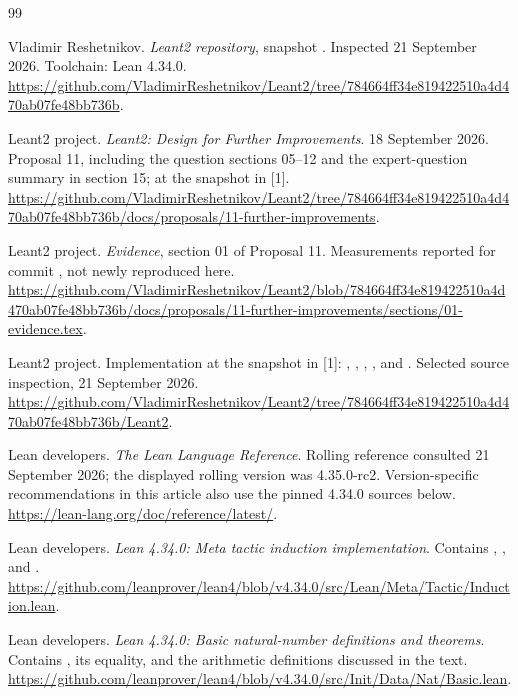 \begin{thebibliography}{99}
\small\raggedright
\setlength{\itemsep}{2pt}
\setlength{\parsep}{0pt}
\setlength{\parskip}{0pt}

 Vladimir Reshetnikov.
\emph{Leant2 repository}, snapshot
.
Inspected 21 September 2026. Toolchain: Lean 4.34.0.
\url{https://github.com/VladimirReshetnikov/Leant2/tree/784664ff34e819422510a4d470ab07fe48bb736b}.

 Leant2 project.
\emph{Leant2: Design for Further Improvements}.
18 September 2026. Proposal 11, including the question sections 05--12 and the expert-question summary in section 15; at the snapshot in [1].
\url{https://github.com/VladimirReshetnikov/Leant2/tree/784664ff34e819422510a4d470ab07fe48bb736b/docs/proposals/11-further-improvements}.

 Leant2 project.
\emph{Evidence}, section 01 of Proposal 11.
Measurements reported for commit , not newly reproduced here.
\url{https://github.com/VladimirReshetnikov/Leant2/blob/784664ff34e819422510a4d470ab07fe48bb736b/docs/proposals/11-further-improvements/sections/01-evidence.tex}.

 Leant2 project.
Implementation at the snapshot in [1]:
,
,
,
, and
.
Selected source inspection, 21 September 2026.
\url{https://github.com/VladimirReshetnikov/Leant2/tree/784664ff34e819422510a4d470ab07fe48bb736b/Leant2}.

 Lean developers.
\emph{The Lean Language Reference}.
Rolling reference consulted 21 September 2026; the displayed rolling version was 4.35.0-rc2. Version-specific recommendations in this article also use the pinned 4.34.0 sources below.
\url{https://lean-lang.org/doc/reference/latest/}.

 Lean developers.
\emph{Lean 4.34.0: Meta tactic induction implementation}.
Contains , , and .
\url{https://github.com/leanprover/lean4/blob/v4.34.0/src/Lean/Meta/Tactic/Induction.lean}.

 Lean developers.
\emph{Lean 4.34.0: Basic natural-number definitions and theorems}.
Contains , its  equality, and the arithmetic definitions discussed in the text.
\url{https://github.com/leanprover/lean4/blob/v4.34.0/src/Init/Data/Nat/Basic.lean}.


\end{thebibliography}
